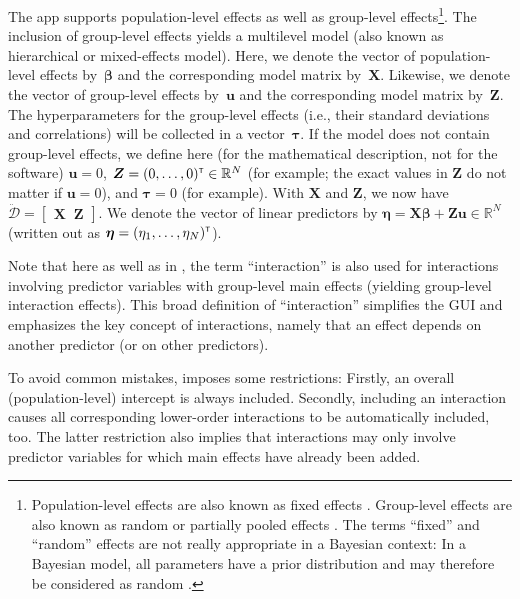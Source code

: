 The  app supports population-level effects as well as
group-level effects\footnote{Population-level effects are also known as
fixed effects \citep{burkner_brms:_2017,
burkner_advanced_2018}. Group-level effects are also known as
random or partially pooled effects \citep{burkner_brms:_2017,
burkner_advanced_2018, goodrich_rstanarm_2022}. The terms ``fixed'' and ``random''
effects are not really appropriate in a Bayesian context: In a Bayesian model, all
parameters have a prior distribution and may therefore be considered as random
\citep{marchenko_spotlight_2015}.}. The inclusion of group-level effects
yields a multilevel model (also known as hierarchical or mixed-effects model).
Here, we denote the vector of population-level effects by~$\boldsymbol{\beta}$
and the corresponding model matrix by~$\boldsymbol{X}$.
Likewise, we denote the vector of group-level effects by~$\boldsymbol{u}$ and the
corresponding model matrix by~$\boldsymbol{Z}$.
The hyperparameters for the group-level effects (i.e., their standard
deviations and correlations) will be collected in a vector~$\boldsymbol{\tau}$.
If the model does not contain group-level effects, we define here (for the
mathematical description, not for the software) $\boldsymbol{u} = 0$,
$\boldsymbol{Z} = (0, \dotsc, 0)^{\scriptscriptstyle \mathsf{T}} \in \mathbb{R}^N$
(for example; the exact values in $\boldsymbol{Z}$ do not matter if $\boldsymbol{u} = 0$),
and $\boldsymbol{\tau} = 0$ (for example).
With $\boldsymbol{X}$ and $\boldsymbol{Z}$, we now have
$\boldsymbol{\ddot{\mathcal{D}}} = \begin{bmatrix}\boldsymbol{X} \;\; \boldsymbol{Z}\end{bmatrix}$.
We denote the vector of linear predictors by $\boldsymbol{\eta} =
\boldsymbol{X} \boldsymbol{\beta} + \boldsymbol{Z} \boldsymbol{u} \in \mathbb{R}^N$
(written out as $\boldsymbol{\eta} = (\eta_1, \dotsc, \eta_N)^{\scriptscriptstyle \mathsf{T}}$).

Note that here as well as in , the term ``interaction''
is also used for interactions involving predictor variables with group-level
main effects (yielding group-level interaction effects). This
broad definition of ``interaction'' simplifies the GUI and emphasizes
the key concept of interactions, namely that an effect depends on another
predictor (or on other predictors).

To avoid common mistakes,  imposes some restrictions: Firstly,
an overall (population-level) intercept is always included. Secondly, including an
interaction causes all corresponding lower-order interactions to be
automatically included, too. The latter restriction also implies that
interactions may only involve predictor variables for which main effects have
already been added.

